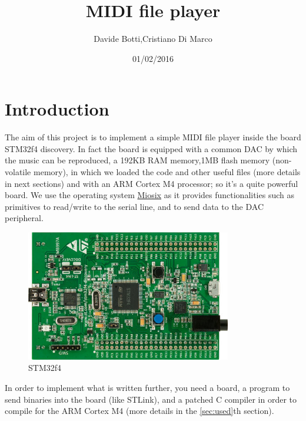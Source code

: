 \documentclass[12pt]{article}
\title{MIDI file player}
\date{01/02/2016}
\author{Davide Botti,Cristiano Di Marco}
\begin{document}
\maketitle
{}
\pagestyle{fancy}
\fancyhead{}
\fancyfoot{}
\fancyfoot[R]{\thepage}
\newpage
{}
\tableofcontents

\newpage
\section{Introduction} \label{sec:intro}
 The aim of this project is to implement a simple MIDI file player inside the board STM32f4 discovery. In fact the board is equipped with a common DAC by which the music can be reproduced, a 192KB RAM memory,1MB flash memory (non-volatile memory), in which we loaded the code and other useful files (more details in next sections) and with an ARM Cortex M4 processor; so it's a quite powerful board. We use the operating system \href{https://miosix.org/}{Miosix} as it provides functionalities such as primitives to read/write to the serial line, and to send data to the DAC peripheral.\newline
 \begin{figure}[H]
 	\includegraphics[width=0.8\textwidth]{STM32F4-Discovery-Board.jpg}
 	\caption{STM32f4}
 	\label{fig:STM32f4Discovery}
 \end{figure}
In order to implement what is written further, you need a board, a program to send binaries into the board (like STLink), and a patched C compiler in order to compile for the ARM Cortex M4 (more details in the \ref{sec:used}th section).
\end{document}
